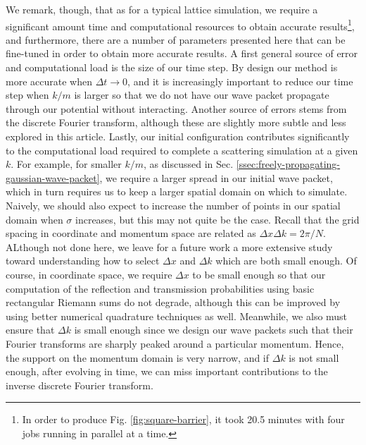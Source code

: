 We remark, though, that as for a typical lattice simulation, we require a significant amount time and computational resources to obtain accurate results\footnote{In order to produce Fig. \ref{fig:square-barrier}, it took 20.5 minutes with four jobs running in parallel at a time.}, and furthermore, there are a number of parameters presented here that can be fine-tuned in order to obtain more accurate results.
A first general source of error and computational load is the size of our time step.
By design our method is more accurate when $\Delta t \rightarrow 0$, and it is increasingly important to reduce our time step when $k/m$ is larger so that we do not have our wave packet propagate through our potential without interacting.
Another source of errors stems from the discrete Fourier transform, although these are slightly more subtle and less explored in this article.
Lastly, our initial configuration contributes significantly to the computational load required to complete a scattering simulation at a given $k$.
For example, for smaller $k/m$, as discussed in Sec. \ref{ssec:freely-propagating-gaussian-wave-packet}, we require a larger spread in our initial wave packet, which in turn requires us to keep a larger spatial domain on which to simulate.
Naively, we should also expect to increase the number of points in our spatial domain when $\sigma$ increases, but this may not quite be the case.
Recall that the grid spacing in coordinate and momentum space are related as $\Delta x \Delta k = 2 \pi / N$.
ALthough not done here, we leave for a future work a more extensive study toward understanding how to select $\Delta x$ and $\Delta k$ which are both small enough.
Of course, in coordinate space, we require $\Delta x$ to be small enough so that our computation of the reflection and transmission probabilities using basic rectangular Riemann sums do not degrade, although this can be improved by using better numerical quadrature techniques as well.
Meanwhile, we also must ensure that $\Delta k$ is small enough since we design our wave packets such that their Fourier transforms are sharply peaked around a particular momentum.
Hence, the support on the momentum domain is very narrow, and if $\Delta k$ is not small enough, after evolving in time, we can miss important contributions to the inverse discrete Fourier transform.

